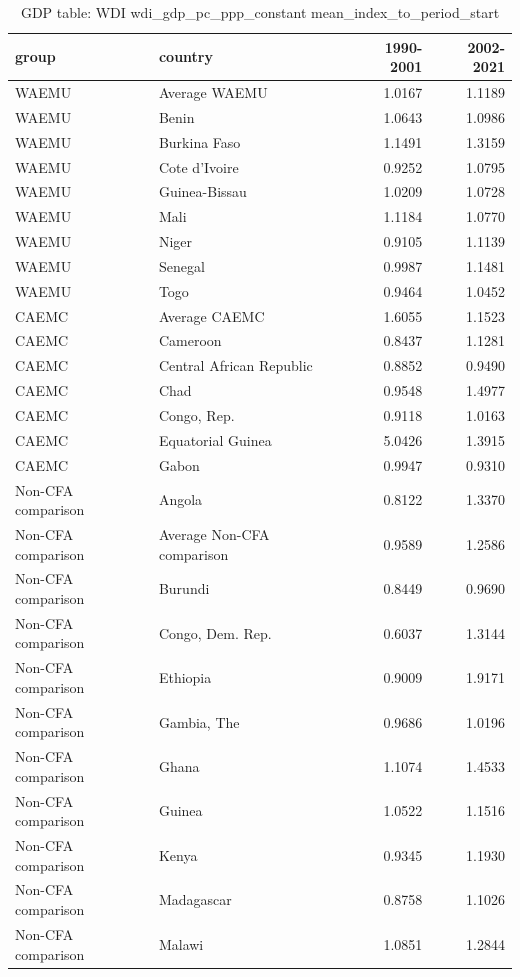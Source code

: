 \begin{table}

\caption{GDP table: WDI wdi_gdp_pc_ppp_constant mean_index_to_period_start}
\centering
\begin{tabular}[t]{llrr}
\toprule
group & country & 1990-2001 & 2002-2021\\
\midrule
WAEMU & Average WAEMU & 1.0167 & 1.1189\\
WAEMU & Benin & 1.0643 & 1.0986\\
WAEMU & Burkina Faso & 1.1491 & 1.3159\\
WAEMU & Cote d'Ivoire & 0.9252 & 1.0795\\
WAEMU & Guinea-Bissau & 1.0209 & 1.0728\\
\addlinespace
WAEMU & Mali & 1.1184 & 1.0770\\
WAEMU & Niger & 0.9105 & 1.1139\\
WAEMU & Senegal & 0.9987 & 1.1481\\
WAEMU & Togo & 0.9464 & 1.0452\\
CAEMC & Average CAEMC & 1.6055 & 1.1523\\
\addlinespace
CAEMC & Cameroon & 0.8437 & 1.1281\\
CAEMC & Central African Republic & 0.8852 & 0.9490\\
CAEMC & Chad & 0.9548 & 1.4977\\
CAEMC & Congo, Rep. & 0.9118 & 1.0163\\
CAEMC & Equatorial Guinea & 5.0426 & 1.3915\\
\addlinespace
CAEMC & Gabon & 0.9947 & 0.9310\\
Non-CFA comparison & Angola & 0.8122 & 1.3370\\
Non-CFA comparison & Average Non-CFA comparison & 0.9589 & 1.2586\\
Non-CFA comparison & Burundi & 0.8449 & 0.9690\\
Non-CFA comparison & Congo, Dem. Rep. & 0.6037 & 1.3144\\
\addlinespace
Non-CFA comparison & Ethiopia & 0.9009 & 1.9171\\
Non-CFA comparison & Gambia, The & 0.9686 & 1.0196\\
Non-CFA comparison & Ghana & 1.1074 & 1.4533\\
Non-CFA comparison & Guinea & 1.0522 & 1.1516\\
Non-CFA comparison & Kenya & 0.9345 & 1.1930\\
\addlinespace
Non-CFA comparison & Madagascar & 0.8758 & 1.1026\\
Non-CFA comparison & Malawi & 1.0851 & 1.2844\\

\end{tabular}
\end{table}
